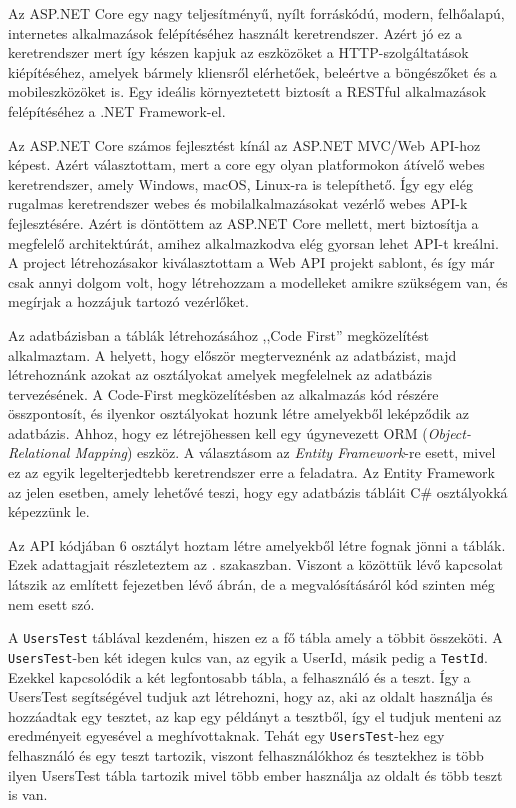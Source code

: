 
Az ASP.NET Core egy nagy teljesítményű, nyílt forráskódú, modern, felhőalapú, internetes alkalmazások felépítéséhez használt keretrendszer. Azért jó ez a keretrendszer mert így készen kapjuk az eszközöket a HTTP-szolgáltatások kiépítéséhez, amelyek bármely kliensről elérhetőek, beleértve a böngészőket és a mobileszközöket is. Egy ideális környeztetett biztosít a RESTful alkalmazások felépítéséhez a .NET Framework-el. \newline

Az ASP.NET Core számos fejlesztést kínál az ASP.NET MVC/Web API-hoz képest. Azért választottam, mert a core egy olyan platformokon átívelő webes keretrendszer, amely Windows, macOS, Linux-ra is telepíthető. Így egy elég rugalmas keretrendszer webes és mobilalkalmazásokat vezérlő webes API-k fejlesztésére. Azért is döntöttem az ASP.NET Core mellett, mert biztosítja a megfelelő architektúrát, amihez alkalmazkodva elég gyorsan lehet API-t kreálni. A project létrehozásakor kiválasztottam a Web API projekt sablont, és így már csak annyi dolgom volt, hogy létrehozzam a modelleket amikre szükségem van, és megírjak a hozzájuk tartozó vezérlőket.


Az adatbázisban a táblák létrehozásához ,,Code First'' megközelítést alkalmaztam. A helyett, hogy először megterveznénk az adatbázist, majd létrehoznánk azokat az osztályokat amelyek megfelelnek az adatbázis tervezésének. A Code-First megközelítésben az alkalmazás kód részére összpontosít, és ilyenkor osztályokat hozunk létre amelyekből leképződik az adatbázis. Ahhoz, hogy ez létrejöhessen kell egy úgynevezett ORM (\textit{Object-Relational Mapping}) eszköz. A választásom az \textit{Entity Framework}-re esett, mivel ez az egyik legelterjedtebb keretrendszer erre a feladatra. Az Entity Framework az jelen esetben, amely lehetővé teszi, hogy egy adatbázis tábláit C\# osztályokká képezzünk le. \newline

Az API kódjában 6 osztályt hoztam létre amelyekből létre fognak jönni a táblák. Ezek adattagjait részleteztem az . szakaszban.
Viszont a közöttük lévő kapcsolat látszik az említett fejezetben lévő ábrán, de a megvalósításáról kód szinten még nem esett szó. \newline

A \texttt{UsersTest} táblával kezdeném, hiszen ez a fő tábla amely a többit összeköti.
A \texttt{UsersTest}-ben két idegen kulcs van, az egyik a UserId, másik pedig a \texttt{TestId}. Ezekkel kapcsolódik a két legfontosabb tábla, a felhasználó és a teszt. Így a UsersTest segítségével tudjuk azt létrehozni, hogy az, aki az oldalt használja és hozzáadtak egy tesztet, az kap egy példányt a tesztből, így el tudjuk menteni az eredményeit egyesével a meghívottaknak.
Tehát egy \texttt{UsersTest}-hez egy felhasználó és egy teszt tartozik, viszont felhasználókhoz és tesztekhez is több ilyen UsersTest tábla tartozik mivel több ember használja az oldalt és több teszt is van. \newline

